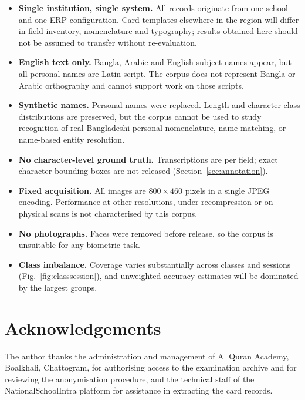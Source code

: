 \documentclass[a4paper,fleqn]{cas-dc}
\begin{document}
\begin{itemize}[leftmargin=*,nosep,labelsep=6pt]
\item \textbf{Single institution, single system.} All records originate from
one school and one ERP configuration. Card templates elsewhere in the region
will differ in field inventory, nomenclature and typography; results obtained
here should not be assumed to transfer without re-evaluation.
\item \textbf{English text only.} Bangla, Arabic and English subject names
appear, but all personal names are Latin script. The corpus does not represent
Bangla or Arabic orthography and cannot support work on those scripts.
\item \textbf{Synthetic names.} Personal names were replaced. Length and
character-class distributions are preserved, but the corpus cannot be used to
study recognition of real Bangladeshi personal nomenclature, name matching, or
name-based entity resolution.
\item \textbf{No character-level ground truth.} Transcriptions are per field;
exact character bounding boxes are not released
(Section~\ref{sec:annotation}).
\item \textbf{Fixed acquisition.} All images are $800 \times 460$ pixels in a
single JPEG encoding. Performance at other resolutions, under recompression or
on physical scans is not characterised by this corpus.
\item \textbf{No photographs.} Faces were removed before release, so the corpus
is unsuitable for any biometric task.
\item \textbf{Class imbalance.} Coverage varies substantially across classes
and sessions (Fig.~\ref{fig:classsession}), and unweighted accuracy estimates
will be dominated by the largest groups.
\end{itemize}

\section*{Acknowledgements}

The author thanks the administration and management of Al Quran Academy,
Boalkhali, Chattogram, for authorising access to the examination archive and for
reviewing the anonymisation procedure, and the technical staff of the
NationalSchoolIntra platform for assistance in extracting the card records.
\end{document}
